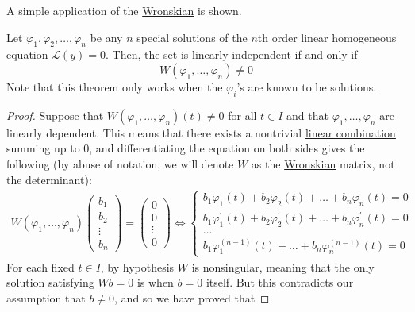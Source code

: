 \documentclass{article}
\newcounter{theorem}[section]
\begin{document}
    A simple application of the \hyperref[def:wronskian]{Wronskian} is shown. 
    \begin{theorem}
      \label{thm:wronskian-criterion-for-a-fundamental-system}
    Let $\varphi_1, \varphi_2, \ldots, \varphi_n$ be any $n$ special solutions of the $n$th order linear homogeneous equation $\mathcal{L}(y) = 0$. Then, the set is linearly independent if and only if 
    \begin{equation}
      W(\varphi_1, \ldots, \varphi_n) \neq 0
    \end{equation}
    Note that this theorem only works when the $\varphi_i$'s are known to be solutions. 
    \end{theorem}
    \begin{proof}
    Suppose that $W(\varphi_1, \ldots, \varphi_n) (t) \neq 0$ for all $t \in I$ and that $\varphi_1, \ldots, \varphi_n$ are linearly dependent. This means that there exists a nontrivial \hyperref[lin-def:linear-combination]{linear combination} summing up to $0$, and differentiating the equation on both sides gives the following (by abuse of notation, we will denote $W$ as the \hyperref[def:wronskian]{Wronskian} matrix, not the determinant): 
    \begin{align*}
        W(\varphi_1, \ldots, \varphi_n) \begin{pmatrix}
        b_1 \\ b_2 \\ \vdots \\ b_n \end{pmatrix} = \begin{pmatrix}
        0 \\ 0 \\ \vdots \\ 0 \end{pmatrix} \iff
        \begin{cases}
        b_1 \varphi_1 (t) + b_2 \varphi_2 (t) + \ldots + b_n \varphi_n (t) = 0 \\
        b_1 \varphi^\prime_1 (t) + b_2 \varphi^\prime_2 (t) + \ldots + b_n \varphi^\prime_n (t) = 0 \\
        \ldots \\
        b_1 \varphi^{(n-1)}_1 (t) + \ldots + b_n \varphi^{(n-1)}_n (t) = 0 
        \end{cases}
    \end{align*}
    For each fixed $t \in I$, by hypothesis $W$ is nonsingular, meaning that the only solution satisfying $W b = 0$ is when $b = 0$ itself. But this contradicts our assumption that $b \neq 0$, and so we have proved that

\end{proof}
\end{document}
